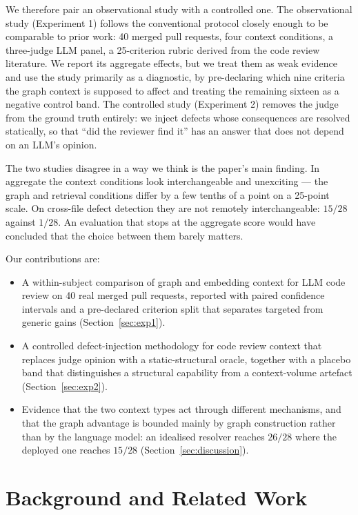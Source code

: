 \documentclass[conference]{IEEEtran}
\begin{document}
We therefore pair an observational study with a controlled one. The
observational study (Experiment 1) follows the conventional protocol closely
enough to be comparable to prior work: 40 merged pull requests, four context
conditions, a three-judge LLM panel, a 25-criterion rubric derived from the
code review literature. We report its aggregate effects, but we treat them as
weak evidence and use the study primarily as a diagnostic, by pre-declaring
which nine criteria the graph context is supposed to affect and treating the
remaining sixteen as a negative control band. The controlled study
(Experiment 2) removes the judge from the ground truth entirely: we inject
defects whose consequences are resolved statically, so that ``did the
reviewer find it'' has an answer that does not depend on an LLM's opinion.

The two studies disagree in a way we think is the paper's main finding. In
aggregate the context conditions look interchangeable and unexciting --- the
graph and retrieval conditions differ by a few tenths of a point on a
25-point scale. On cross-file defect detection they are not remotely
interchangeable: $15/28$ against $1/28$. An evaluation that stops at the
aggregate score would have concluded that the choice between them barely
matters.

Our contributions are:

\begin{itemize}[leftmargin=*]
\item A within-subject comparison of graph and embedding context for LLM code
      review on 40 real merged pull requests, reported with paired confidence
      intervals and a pre-declared criterion split that separates targeted
      from generic gains (Section~\ref{sec:exp1}).
\item A controlled defect-injection methodology for code review context that
      replaces judge opinion with a static-structural oracle, together with a
      placebo band that distinguishes a structural capability from a
      context-volume artefact (Section~\ref{sec:exp2}).
\item Evidence that the two context types act through different mechanisms,
      and that the graph advantage is bounded mainly by graph construction
      rather than by the language model: an idealised resolver reaches
      $26/28$ where the deployed one reaches $15/28$
      (Section~\ref{sec:discussion}).
\end{itemize}

\section{Background and Related Work}
\label{sec:related}
\end{document}
